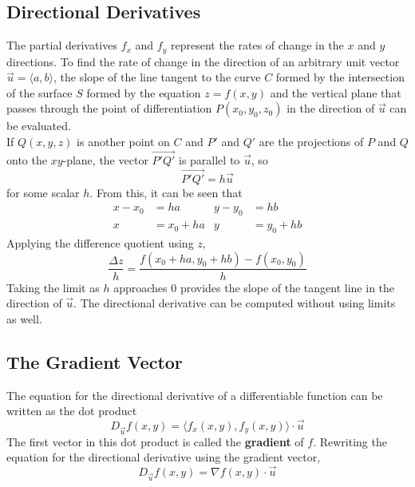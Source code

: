 \documentclass[../Calculus_\Roman{3}]{subfiles}
\begin{document}
		\subsection*{Directional Derivatives}
			The partial derivatives $f_x$ and $f_y$ represent the rates of change in the $x$ and $y$ directions. To find the rate of change in the direction of an arbitrary unit vector $\vec{u} = \langle a, b \rangle$, the slope of the line tangent to the curve $C$ formed by the intersection of the surface $S$ formed by the equation $z = f(x, y)$ and the vertical plane that passes through the point of differentiation $P(x_0, y_0, z_0)$ in the direction of $\vec{u}$ can be evaluated. \\
			If $Q(x, y, z)$ is another point on $C$ and $P'$ and $Q'$ are the projections of $P$ and $Q$ onto the $xy$-plane, the vector $\Vec{P'Q'}$ is parallel to $\vec{u}$, so
				\[\Vec{P'Q'} = h\vec{u}\]
				for some scalar $h$. From this, it can be seen that
				\begin{align*}
					x - x_0 &= ha &
						y - y_0 &= hb \\
					x &= x_0 + ha &
						y &= y_0 + hb
				\end{align*}
				Applying the difference quotient using $z$,
				\[\frac{\Delta z}{h} = \frac{f(x_0 + ha, y_0 + hb) - f(x_0, y_0)}{h}\]
				Taking the limit as $h$ approaches 0 provides the slope of the tangent line in the direction of $\vec{u}$.
			The directional derivative can be computed without using limits as well.
		\subsection*{The Gradient Vector}
			The equation for the directional derivative of a differentiable function can be written as the dot product
				\[D_{\vec{u}}f(x, y) = \langle f_x(x, y), f_y(x, y) \rangle \cdot \vec{u}\]
				The first vector in this dot product is called the \textbf{gradient} of $f$.
			Rewriting the equation for the directional derivative using the gradient vector,
				\[D_{\vec{u}}f(x, y) = \nabla f(x, y) \cdot \vec{u}\]
\end{document}
